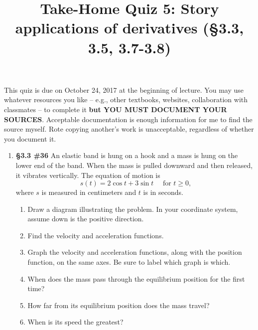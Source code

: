 \documentclass[%
]{article}
\title{\vspace{-3.5pc} 
	\flushleft \bf \Large Take-Home Quiz 5: Story applications of derivatives %
	 (\S3.3, 3.5, 3.7-3.8)}
\date{}
\begin{document}
\maketitle

\vspace{-3pc}
 This quiz is due on October 24, 2017 at the beginning of lecture.  You may use whatever resources you like -- e.g., other textbooks, websites, collaboration with classmates -- to complete it \textbf{but YOU MUST DOCUMENT YOUR SOURCES}.  Acceptable documentation is enough information for me to find the source myself.  Rote copying another's work is unacceptable, regardless of whether you document it.  

\noindent\hrulefill

\begin{enumerate}

\item {\bf \S3.3 \#36} An elastic band is hung on a hook and a mass is hung on the lower end of the band.  When the mass is pulled downward and then released, it vibrates vertically.  The equation of motion is 
\[
s(t)=2\cos t+3\sin t\quad\text{ for $t\geq 0$,}
\]
where $s$ is measured in centimeters and $t$ is in seconds.
	\begin{enumerate}
	\item Draw a diagram illustrating the problem.  In your coordinate system, assume down is the positive direction.
	\item Find the velocity and acceleration functions.
	\item Graph the velocity and acceleration functions, along with the position function, on the same axes.  Be sure to label which graph is which.
	\item When does the mass pass through the equilibrium position for the first time?
	\item How far from its equilibrium position does the mass travel?
	\item When is its speed the greatest?
	\end{enumerate}


\end{enumerate}
\end{document}

